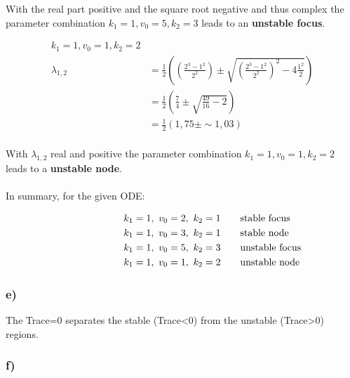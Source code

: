 \documentclass[]{scrartcl}
\begin{document}
With the real part positive and the square root negative and thus complex the parameter combination $k_1 = 1, v_0 = 5, k_2 = 3$ leads to an \textbf{unstable focus}.

\begin{center}
\begin{align*}
	k_1 = 1, v_0 = 1, k_2 = 2 & \\
	\lambda_{1,2}	& =  \frac{1}{2} \left( \left( \frac{2^3 - 1^2}{2^2} \right) \pm \sqrt{ \left( \frac{2^3 - 1^2}{2^2}  \right)^2 - 4 \frac{1^2}{2} } \right) \\
					& =  \frac{1}{2} \left( \frac{7}{4} \pm \sqrt{ \frac{49}{16} - 2 } \right) \\
					& =  \frac{1}{2} \left( 1,75 \pm \sim 1,03 \right) \\
\end{align*}
\end{center}

With $\lambda_{1,2}$ real and positive the parameter combination $k_1 = 1, v_0 = 1, k_2 = 2$ leads to a \textbf{unstable node}.
\\
\\
In summary, for the given ODE:

\begin{center}
\begin{align*}
	k_1 = 1, ~ v_0 = 2, ~ k_2 = 1 & \hspace{1em} & \rlap{stable focus} \\
	k_1 = 1, ~ v_0 = 3, ~ k_2 = 1 & \hspace{1em} & \rlap{stable node} \\
	k_1 = 1, ~ v_0 = 5, ~ k_2 = 3 & \hspace{1em} & \rlap{unstable focus} \\
	k_1 = 1, ~ v_0 = 1, ~ k_2 = 2 & \hspace{1em} & \rlap{unstable node} \\
\end{align*}
\end{center}


\subsubsection*{e)}

The Trace=0 separates the stable (Trace<0) from the unstable (Trace>0) regions.


\subsubsection*{f)}
\end{document}
